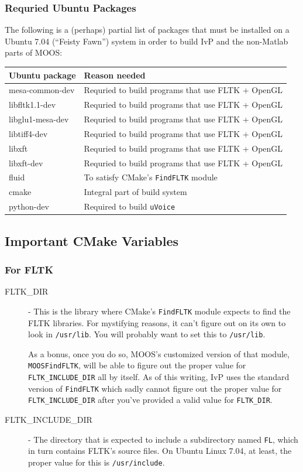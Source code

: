 \documentclass[letterpaper,10pt]{article}
\begin{document}
\subsubsection{Requried Ubuntu Packages}
The following is a (perhaps) partial list of packages that must be installed on a 
Ubuntu 7.04 (``Feisty Fawn'') system in order to build IvP and the non-Matlab parts
of MOOS:
\begin{center}
\begin{tabular}{|l|l|}
\hline
Ubuntu package & Reason needed \\
\hline
\hline
mesa-common-dev & Requried to build programs that use FLTK + OpenGL \\
\hline
libfltk1.1-dev & Requried to build programs that use FLTK + OpenGL \\
\hline
libglu1-mesa-dev & Requried to build programs that use FLTK + OpenGL \\
\hline
libtiff4-dev & Requried to build programs that use FLTK + OpenGL \\
\hline
libxft & Requried to build programs that use FLTK + OpenGL \\
\hline
libxft-dev & Requried to build programs that use FLTK + OpenGL \\
\hline
fluid & To satisfy CMake's \verb|FindFLTK| module \\
\hline
cmake & Integral part of build system \\
\hline
python-dev & Required to build \verb|uVoice|\\
\hline
\end{tabular}
\end{center}


\subsection{Important CMake Variables}
\subsubsection{For FLTK}
\begin{description}
 \item[FLTK\_DIR] - This is the library where CMake's \verb|FindFLTK| module expects to 
	find the FLTK libraries.  For mystifying reasons, it can't figure out on its own
	to look in \verb|/usr/lib|.  You will probably want to set this to \verb|/usr/lib|.

	As a bonus, once you do so, MOOS's customized version of that module, \verb|MOOSFindFLTK|,
	will be able to figure out the proper value for \verb|FLTK_INCLUDE_DIR| all by itself.
	As of this writing, IvP uses the standard version of \verb|FindFLTK| which sadly
	cannot figure out the proper value for \verb|FLTK_INCLUDE_DIR| after you've provided
	a valid value for \verb|FLTK_DIR|.

 \item[FLTK\_INCLUDE\_DIR] - The directory that is expected to include a subdirectory 
	named \verb|FL|,
	which in turn contains FLTK's source files.  On Ubuntu Linux 7.04, at least, the 
	proper value for this is \verb|/usr/include|.
 \end{description}
\end{document}

